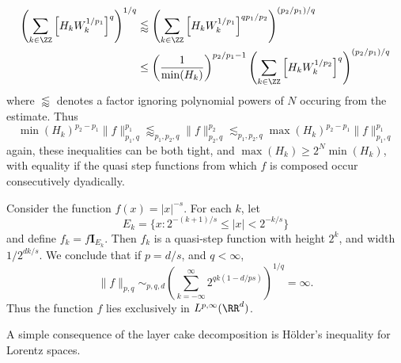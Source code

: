 \begin{remark}
\begin{align*}
    \end{align*}
    \begin{align*}
        \left( \sum_{k \in \ZZ} \left[ H_k W_k^{1/p_1} \right]^q \right)^{1/q} &\lessapprox \left( \sum_{k \in \ZZ} \left[ H_k W_k^{1/p_1} \right]^{qp_1/p_2} \right)^{(p_2/p_1)/q}\\
        &\leq \left( \frac{1}{\min(H_k)} \right)^{p_2/p_1 - 1} \left( \sum_{k \in \ZZ} \left[ H_k W_k^{1/p_2} \right]^q \right)^{(p_2/p_1)/q}
    \end{align*}
    where $\lessapprox$ denotes a factor ignoring polynomial powers of $N$ occuring from the estimate. Thus
    \[ \min(H_k)^{p_2 - p_1} \| f \|_{p_1,q}^{p_1} \lessapprox_{p_1,p_2,q} \| f \|_{p_2,q}^{p_2} \lesssim_{p_1,p_2,q} \max(H_k)^{p_2-p_1} \| f \|_{p_1,q}^{p_1} \]
    again, these inequalities can be both tight, and $\max(H_k) \geq 2^N \min(H_k)$, with equality if the quasi step functions from which $f$ is composed occur consecutively dyadically.
\end{remark}

\begin{example}
    Consider the function $f(x) = |x|^{-s}$. For each $k$, let
    \[ E_k = \{ x : 2^{-(k+1)/s} \leq |x| < 2^{-k/s} \} \]
    and define $f_k = f \mathbf{I}_{E_k}$. Then $f_k$ is a quasi-step function with height $2^k$, and width $1/2^{dk/s}$. We conclude that if $p = d/s$, and $q < \infty$,
    \[ \| f \|_{p,q} \sim_{p,q,d} \left( \sum_{k = -\infty}^\infty 2^{qk(1 - d/ps)} \right)^{1/q} = \infty. \]
    Thus the function $f$ lies exclusively in $L^{p,\infty}(\RR^d)$.
\end{example}

A simple consequence of the layer cake decomposition is H\"{o}lder's inequality for Lorentz spaces.

